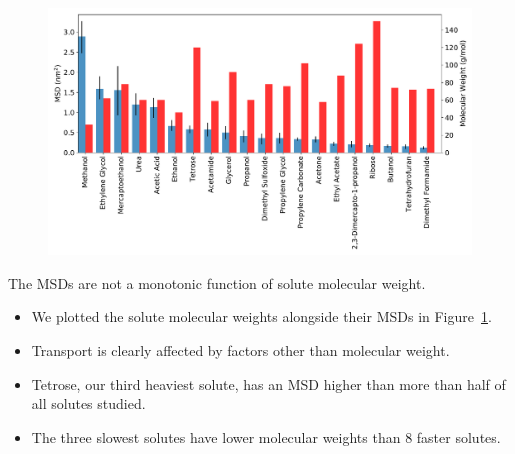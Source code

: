 \documentclass{article}
\begin{document}
%
  
  \begin{figure}
  \centering
  \includegraphics[width=\textwidth]{all_tamsds.pdf}  %
  \caption{}\label{fig:all_msds}
  \end{figure}
  
  \noindent The MSDs are not a monotonic function of solute molecular weight.
  \begin{itemize}
  	\item We plotted the solute molecular weights alongside their MSDs in Figure~\ref{fig:all_msds}.
  	\item Transport is clearly affected by factors other than molecular weight. 
  	\item Tetrose, our third heaviest solute, has an MSD higher than more than half of
  	all solutes studied. 
  	\item The three slowest solutes have lower molecular weights than 8 faster solutes.
  \end{itemize}
  
\end{document}
